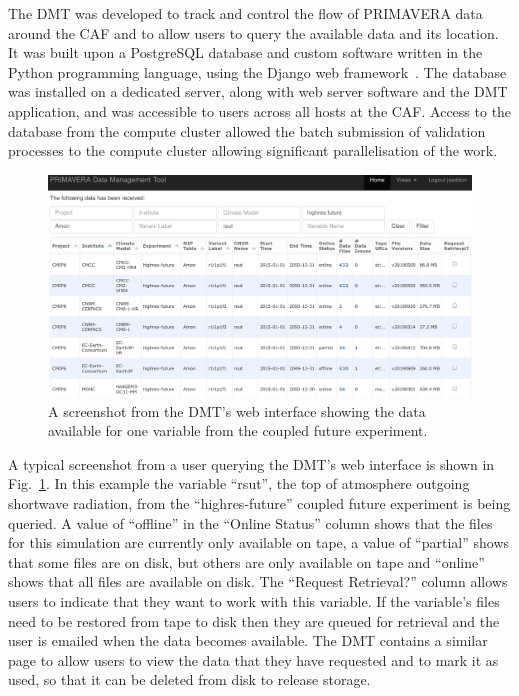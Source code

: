 \documentclass[gmd, manuscript]{copernicus}
\begin{document}
The DMT was developed to track and control the flow of PRIMAVERA data around the CAF and to allow users to query the available data and its location. It was built upon a PostgreSQL database and custom software written in the Python programming language, using the Django web framework~\citep{Django}. The database was installed on a dedicated server, along with web server software and the DMT application, and was accessible to users across all hosts at the CAF. Access to the database from the compute cluster allowed the batch submission of validation processes to the  compute cluster allowing significant parallelisation of the work.

\begin{figure}[ht]
	\includegraphics[width=12cm]{fig03.png}
	\caption{A screenshot from the DMT's web interface showing the data available for one variable from the coupled future experiment.}
	\label{dmt_query}
\end{figure}

A typical screenshot from a user querying the DMT's web interface is shown in Fig.~\ref{dmt_query}. In this example the variable ``rsut'', the top of atmosphere outgoing shortwave radiation, from the ``highres-future'' coupled future experiment is being queried. A value of ``offline'' in the ``Online Status'' column shows that the files for this simulation are currently only available on tape, a value of ``partial'' shows that some files are on disk, but others are only available on tape and ``online'' shows that all files are available on disk. The ``Request Retrieval?'' column allows users to indicate that they want to work with this variable. If the variable's files need to be restored from tape to disk then they are queued for retrieval and the user is emailed when the data becomes available. The DMT contains a similar page to allow users to view the data that they have requested and to mark it as used, so that it can be deleted from disk to release storage.
\end{document}
